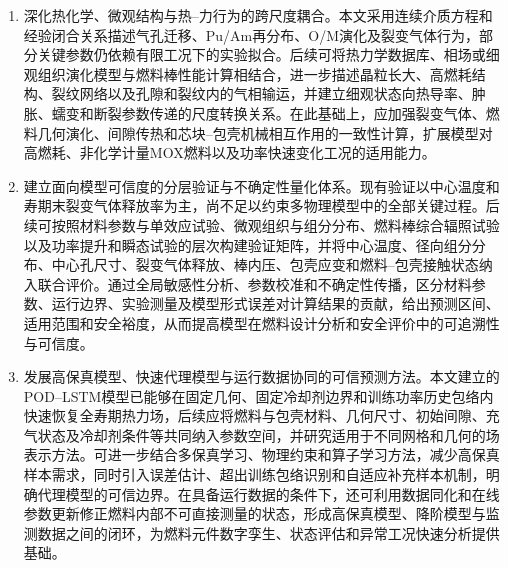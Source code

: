 \begin{enumerate}[label={（\arabic*）},leftmargin=2.8em]
	\item 深化热化学、微观结构与热--力行为的跨尺度耦合。本文采用连续介质方程和经验闭合关系描述气孔迁移、Pu/Am再分布、O/M演化及裂变气体行为，部分关键参数仍依赖有限工况下的实验拟合。后续可将热力学数据库、相场或细观组织演化模型与燃料棒性能计算相结合，进一步描述晶粒长大、高燃耗结构、裂纹网络以及孔隙和裂纹内的气相输运，并建立细观状态向热导率、肿胀、蠕变和断裂参数传递的尺度转换关系。在此基础上，应加强裂变气体、燃料几何演化、间隙传热和芯块--包壳机械相互作用的一致性计算，扩展模型对高燃耗、非化学计量MOX燃料以及功率快速变化工况的适用能力。
	
	\item 建立面向模型可信度的分层验证与不确定性量化体系。现有验证以中心温度和寿期末裂变气体释放率为主，尚不足以约束多物理模型中的全部关键过程。后续可按照材料参数与单效应试验、微观组织与组分分布、燃料棒综合辐照试验以及功率提升和瞬态试验的层次构建验证矩阵，并将中心温度、径向组分分布、中心孔尺寸、裂变气体释放、棒内压、包壳应变和燃料--包壳接触状态纳入联合评价。通过全局敏感性分析、参数校准和不确定性传播，区分材料参数、运行边界、实验测量及模型形式误差对计算结果的贡献，给出预测区间、适用范围和安全裕度，从而提高模型在燃料设计分析和安全评价中的可追溯性与可信度。
	
	\item 发展高保真模型、快速代理模型与运行数据协同的可信预测方法。本文建立的POD--LSTM模型已能够在固定几何、固定冷却剂边界和训练功率历史包络内快速恢复全寿期热力场，后续应将燃料与包壳材料、几何尺寸、初始间隙、充气状态及冷却剂条件等共同纳入参数空间，并研究适用于不同网格和几何的场表示方法。可进一步结合多保真学习、物理约束和算子学习方法，减少高保真样本需求，同时引入误差估计、超出训练包络识别和自适应补充样本机制，明确代理模型的可信边界。在具备运行数据的条件下，还可利用数据同化和在线参数更新修正燃料内部不可直接测量的状态，形成高保真模型、降阶模型与监测数据之间的闭环，为燃料元件数字孪生、状态评估和异常工况快速分析提供基础。
\end{enumerate}
